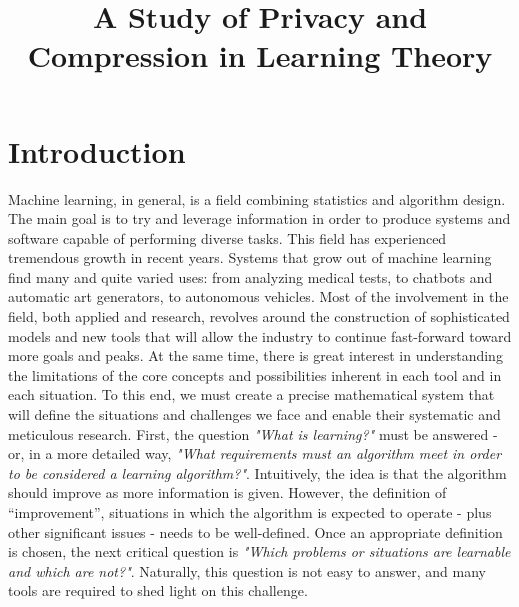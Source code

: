 \documentclass[12pt,a4paper,oneside,onecolumn]{book}
\title{A Study of Privacy and Compression in Learning Theory}
\begin{document}
\hypersetup{pageanchor=false}





\frontmatter

\setcounter{tocdepth}{2}
\tableofcontents
\listofalgorithms

\mainmatter
\hypersetup{pageanchor=true}


\chapter{Introduction}

%
%

%
%
%
%
%



%

Machine learning, in general, is a field combining statistics and algorithm design. The main goal is to try and leverage information in order to produce systems and software capable of performing diverse tasks.
%
%
This field has experienced tremendous growth in recent years. Systems that grow out of machine learning find many and quite varied uses: from analyzing medical tests, to chatbots and automatic art generators, to autonomous vehicles. 
Most of the involvement in the field, both applied and research, revolves around the construction of sophisticated models and new tools that will allow the industry to continue fast-forward toward more goals and peaks. 
At the same time, there is great interest in understanding the limitations of the core concepts and possibilities inherent in each tool and in each situation. To this end, we must create a precise mathematical system that will define the situations and challenges we face and enable their systematic and meticulous research. 
First, the question \emph{"What is learning?"} must be answered - or, in a more detailed way, \emph{"What requirements must an algorithm meet in order to be considered a learning algorithm?"}. 
Intuitively, the idea is that the algorithm should improve as more information is given. However, the definition of “improvement”, situations in which the algorithm is expected to operate -  plus other significant issues - needs to be well-defined. 
Once an appropriate definition is chosen, the next critical question is \emph{"Which problems or situations are learnable and which are not?"}. Naturally, this question is not easy to answer, and many tools are required to shed light on this challenge.
 
\end{document}
